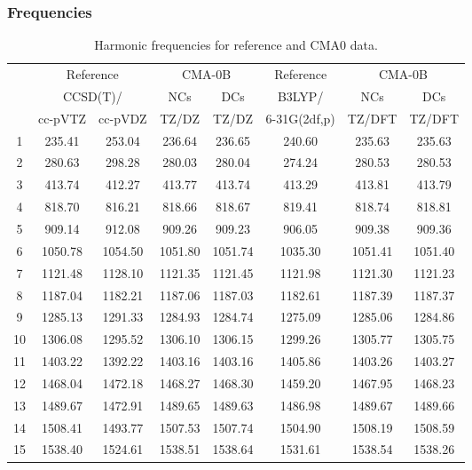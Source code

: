 \documentclass[10pt,oneside]{article}
\begin{document}
\subsubsection*{Frequencies}
\begin{table}[h!]
\centering
\caption{Harmonic frequencies for reference and CMA0 data.}
\begin{tabular}{cccccccc}
\toprule
{} & \multicolumn{2}{c}{Reference} & \multicolumn{2}{c}{CMA-0B} &    Reference & \multicolumn{2}{c}{CMA-0B} \\
{} & \multicolumn{2}{c}{CCSD(T)/} &     NCs &     DCs &       B3LYP/ &     NCs &     DCs \\
{} &   cc-pVTZ & cc-pVDZ &   TZ/DZ &   TZ/DZ & 6-31G(2df,p) &  TZ/DFT &  TZ/DFT \\
\midrule
1  &    235.41 &  253.04 &  236.64 &  236.65 &       240.60 &  235.63 &  235.63 \\
2  &    280.63 &  298.28 &  280.03 &  280.04 &       274.24 &  280.53 &  280.53 \\
3  &    413.74 &  412.27 &  413.77 &  413.74 &       413.29 &  413.81 &  413.79 \\
4  &    818.70 &  816.21 &  818.66 &  818.67 &       819.41 &  818.74 &  818.81 \\
5  &    909.14 &  912.08 &  909.26 &  909.23 &       906.05 &  909.38 &  909.36 \\
6  &   1050.78 & 1054.50 & 1051.80 & 1051.74 &      1035.30 & 1051.41 & 1051.40 \\
7  &   1121.48 & 1128.10 & 1121.35 & 1121.45 &      1121.98 & 1121.30 & 1121.23 \\
8  &   1187.04 & 1182.21 & 1187.06 & 1187.03 &      1182.61 & 1187.39 & 1187.37 \\
9  &   1285.13 & 1291.33 & 1284.93 & 1284.74 &      1275.09 & 1285.06 & 1284.86 \\
10 &   1306.08 & 1295.52 & 1306.10 & 1306.15 &      1299.26 & 1305.77 & 1305.75 \\
11 &   1403.22 & 1392.22 & 1403.16 & 1403.16 &      1405.86 & 1403.26 & 1403.27 \\
12 &   1468.04 & 1472.18 & 1468.27 & 1468.30 &      1459.20 & 1467.95 & 1468.23 \\
13 &   1489.67 & 1472.91 & 1489.65 & 1489.63 &      1486.98 & 1489.67 & 1489.66 \\
14 &   1508.41 & 1493.77 & 1507.53 & 1507.74 &      1504.90 & 1508.19 & 1508.59 \\
15 &   1538.40 & 1524.61 & 1538.51 & 1538.64 &      1531.61 & 1538.54 & 1538.26 \\

\end{tabular}
\end{table}
\end{document}
